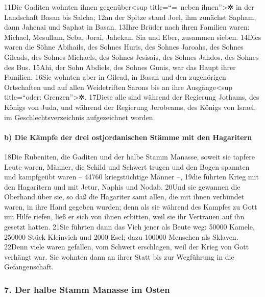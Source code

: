 11Die Gaditen wohnten ihnen gegenüber\textless sup title=``=~neben
ihnen''\textgreater✲ in der Landschaft Basan bis Salcha; 12an der Spitze
stand Joel, ihm zunächst Sapham, dann Jahenai und Saphat in Basan.
13Ihre Brüder nach ihren Familien waren: Michael, Mesullam, Seba, Jorai,
Jahekan, Sia und Eber, zusammen sieben. 14Dies waren die Söhne Abihails,
des Sohnes Huris, des Sohnes Jaroahs, des Sohnes Gileads, des Sohnes
Michaels, des Sohnes Jesisais, des Sohnes Jahdos, des Sohnes des Bus.
15Ahi, der Sohn Abdiels, des Sohnes Gunis, war das Haupt ihrer Familien.
16Sie wohnten aber in Gilead, in Basan und den zugehörigen Ortschaften
und auf allen Weidetriften Sarons bis an ihre Ausgänge\textless sup
title=``oder: Grenzen''\textgreater✲. 17Diese alle sind während der
Regierung Jothams, des Königs von Juda, und während der Regierung
Jerobeams, des Königs von Israel, im Geschlechtsverzeichnis
aufgezeichnet worden.

\hypertarget{b-die-kuxe4mpfe-der-drei-ostjordanischen-stuxe4mme-mit-den-hagaritern}{%
\paragraph{b) Die Kämpfe der drei ostjordanischen Stämme mit den
Hagaritern}\label{b-die-kuxe4mpfe-der-drei-ostjordanischen-stuxe4mme-mit-den-hagaritern}}

18Die Rubeniten, die Gaditen und der halbe Stamm Manasse, soweit sie
tapfere Leute waren, Männer, die Schild und Schwert trugen und den Bogen
spannten und kampfgeübt waren -- 44760 kriegstüchtige Männer --, 19die
führten Krieg mit den Hagaritern und mit Jetur, Naphis und Nodab. 20Und
sie gewannen die Oberhand über sie, so daß die Hagariter samt allen, die
mit ihnen verbündet waren, in ihre Hand gegeben wurden; denn als sie
während des Kampfes zu Gott um Hilfe riefen, ließ er sich von ihnen
erbitten, weil sie ihr Vertrauen auf ihn gesetzt hatten. 21Sie führten
dann das Vieh jener als Beute weg: 50000 Kamele, 250000 Stück Kleinvieh
und 2000 Esel; dazu 100000 Menschen als Sklaven. 22Denn viele waren
gefallen, vom Schwert erschlagen, weil der Krieg von Gott verhängt war.
Sie wohnten dann an ihrer Statt bis zur Wegführung in die
Gefangenschaft.

\hypertarget{der-halbe-stamm-manasse-im-osten}{%
\subsubsection{7. Der halbe Stamm Manasse im
Osten}\label{der-halbe-stamm-manasse-im-osten}}

